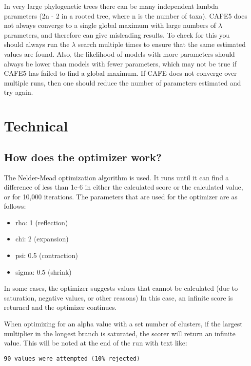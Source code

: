 \documentclass{article}
\newcommand{\shortname}{CAFE5 }
\begin{document}
In very large phylogenetic trees there can be many independent lambda parameters (2n - 2 in a rooted tree, where n is the number of taxa). \shortname does not always converge to a single global maximum with large numbers of $\lambda$ parameters, and therefore can give misleading results. To check for this you should always run the $\lambda$ search multiple times to ensure that the same estimated values are found. Also, the likelihood of models with more parameters should always be lower than models with fewer parameters, which may not be true if \shortname has failed to find a global maximum. If CAFE does not converge over multiple runs, then one should reduce the number of parameters estimated and try again.

\section{Technical}

\subsection{How does the optimizer work?}

The Nelder-Mead optimization algorithm is used. It runs until it can find a difference of less than 1e-6 in either the calculated score or the calculated value, or for 10,000 iterations. The parameters that are used for the optimizer are as follows:

\begin{itemize}
  \item rho: 1 (reflection)
  \item chi: 2 (expansion)
  \item psi: 0.5 (contraction)
  \item sigma: 0.5 (shrink)
\end{itemize}

In some cases, the optimizer suggests values that cannot be calculated (due to saturation, negative values, or other reasons) In this case, an infinite score is returned and the optimizer continues.

When optimizing for an alpha value with a set number of clusters, if the largest multiplier in the longest branch is saturated, the scorer will return an infinite value. This will be noted at the end of the run with text like:

\begin{lstlisting}
90 values were attempted (10% rejected)
\end{lstlisting}
\end{document}
